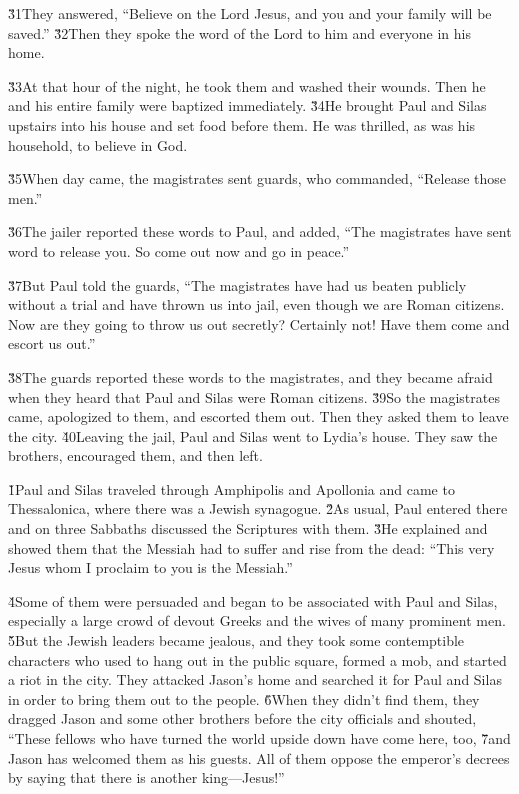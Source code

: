 \v{31}They answered, ``Believe on the Lord Jesus, and you and your family will be saved.'' \v{32}Then they spoke the word of the Lord to him and everyone in his home.

\v{33}At that hour of the night, he took them and washed their wounds. Then he and his entire family were baptized immediately. \v{34}He brought Paul and Silas upstairs into his house and set food before them. He was thrilled, as was his household, to believe in God.

\v{35}When day came, the magistrates sent guards, who commanded, ``Release those men.''

\v{36}The jailer reported these words to Paul, and added, ``The magistrates have sent word to release you. So come out now and go in peace.''

\v{37}But Paul told the guards, ``The magistrates have had us beaten publicly without a trial and have thrown us into jail, even though we are Roman citizens. Now are they going to throw us out secretly? Certainly not! Have them come and escort us out.''

\v{38}The guards reported these words to the magistrates, and they became afraid when they heard that Paul and Silas were Roman citizens. \v{39}So the magistrates came, apologized to them, and escorted them out. Then they asked them to leave the city. \v{40}Leaving the jail, Paul and Silas went to Lydia's house. They saw the brothers, encouraged them, and then left.

\v{1}Paul and Silas traveled through Amphipolis and Apollonia and came to Thessalonica, where there was a Jewish synagogue. \v{2}As usual, Paul entered there and on three Sabbaths discussed the Scriptures with them. \v{3}He explained and showed them that the Messiah had to suffer and rise from the dead: ``This very Jesus whom I proclaim to you is the Messiah.''

\v{4}Some of them were persuaded and began to be associated with Paul and Silas, especially a large crowd of devout Greeks and the wives of many prominent men. \v{5}But the Jewish leaders became jealous, and they took some contemptible characters who used to hang out in the public square, formed a mob, and started a riot in the city. They attacked Jason's home and searched it for Paul and Silas in order to bring them out to the people. \v{6}When they didn't find them, they dragged Jason and some other brothers before the city officials and shouted, ``These fellows who have turned the world upside down have come here, too, \v{7}and Jason has welcomed them as his guests. All of them oppose the emperor's decrees by saying that there is another king---Jesus!''

